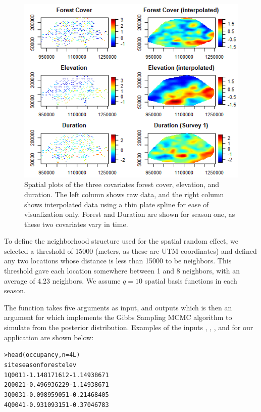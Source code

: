 \begin{figure}[ht]
  \centering
  \includegraphics[width=5.5in]{eda.png}
  \caption{Spatial plots of the three covariates forest cover, elevation, and duration.  The left column shows raw data, and the right column shows interpolated data using a thin plate spline for ease of visualization only.  Forest and Duration are shown for season one, as these two covariates vary in time.}
  \label{figure:covar2}
\end{figure}

To define the neighborhood structure used for the spatial random effect, we selected a threshold of 15000 (meters, as these are UTM coordinates) and defined any two locations whose distance is less than 15000 to be neighbors. This threshold gave each location somewhere between 1 and 8 neighbors, with an average of 4.23 neighbors.  We assume $q=10$ spatial basis functions in each season.

The  function takes five arguments as input, and outputs  which is then an argument for  which implements the Gibbs Sampling MCMC algorithm to simulate from the posterior distribution.  Examples of the inputs , ,  ,  and  for our application are shown below:

\begin{alltt}
> head(occupancy, n=4L)
  site season       forest        elev
1 Q001      1 -1.148171612 -1.14938671
2 Q002      1 -0.496936229 -1.14938671
3 Q003      1 -0.098959051 -0.21468405
4 Q004      1 -0.931093151 -0.37046783
\end{alltt}


